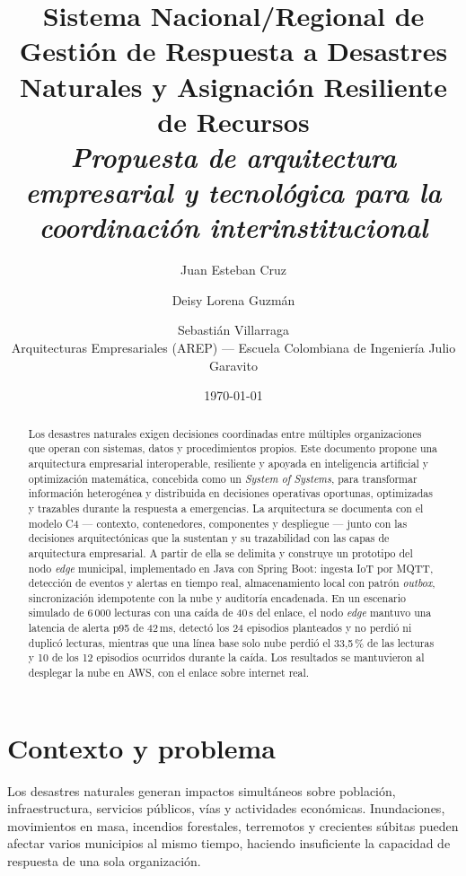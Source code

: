 \documentclass[11pt,a4paper]{article}
\title{\textbf{Sistema Nacional/Regional de Gestión de Respuesta a Desastres
Naturales y Asignación Resiliente de Recursos}\\[0.4em]
\large\normalfont\itshape Propuesta de arquitectura empresarial y tecnológica
para la coordinación interinstitucional}
\author{Juan Esteban Cruz \and Deisy Lorena Guzmán \and Sebastián Villarraga \\[0.3em]
\small Arquitecturas Empresariales (AREP) --- Escuela Colombiana de Ingeniería Julio Garavito}
\date{\today}
\begin{document}
\maketitle

\begin{abstract}
\noindent
Los desastres naturales exigen decisiones coordinadas entre múltiples
organizaciones que operan con sistemas, datos y procedimientos propios.
Este documento propone una arquitectura empresarial interoperable,
resiliente y apoyada en inteligencia artificial y optimización matemática,
concebida como un \emph{System of Systems}, para transformar información
heterogénea y distribuida en decisiones operativas oportunas, optimizadas y
trazables durante la respuesta a emergencias. La arquitectura se documenta con
el modelo C4 --- contexto, contenedores, componentes y despliegue --- junto con
las decisiones arquitectónicas que la sustentan y su trazabilidad con las capas
de arquitectura empresarial. A partir de ella se delimita y construye un
prototipo del nodo \emph{edge} municipal, implementado en Java con Spring Boot:
ingesta IoT por MQTT, detección de eventos y alertas en tiempo real,
almacenamiento local con patrón \emph{outbox}, sincronización idempotente con
la nube y auditoría encadenada.
En un escenario simulado de 6\,000 lecturas con una caída de 40\,s del enlace,
el nodo \emph{edge} mantuvo una latencia de alerta p95 de 42\,ms, detectó los
24 episodios planteados y no perdió ni duplicó lecturas, mientras que una línea
base solo nube perdió el 33,5\,\% de las lecturas y 10 de los 12 episodios
ocurridos durante la caída. Los resultados se mantuvieron al desplegar la nube
en AWS, con el enlace sobre internet real.
\end{abstract}

\tableofcontents
\listoffigures
\bigskip

\section{Contexto y problema}

Los desastres naturales generan impactos simultáneos sobre población,
infraestructura, servicios públicos, vías y actividades económicas.
Inundaciones, movimientos en masa, incendios forestales, terremotos y
crecientes súbitas pueden afectar varios municipios al mismo tiempo,
haciendo insuficiente la capacidad de respuesta de una sola organización.
\end{document}
